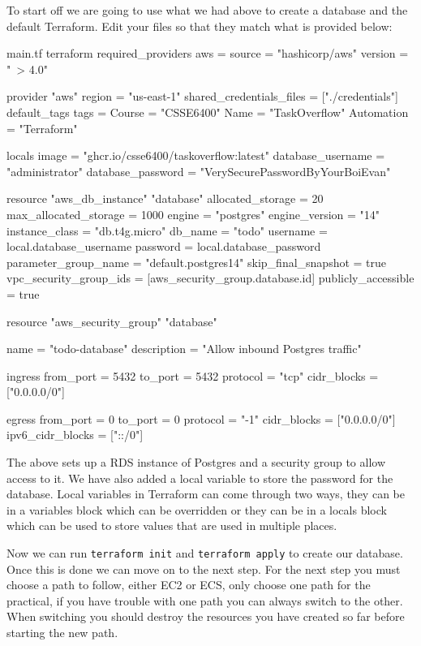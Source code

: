 \documentclass{csse4400}
\begin{document}
To start off we are going to use what we had above to create a database and the default Terraform. Edit your files so that they match what is provided below:

\begin{code}[language=terraform,numbers=none]{main.tf}
  terraform {
    required_providers {
        aws = {
            source  = "hashicorp/aws"
            version = "~> 4.0"
        }
    }
}

provider "aws" {
    region = "us-east-1"
    shared_credentials_files = ["./credentials"]
    default_tags {
        tags = {
            Course       = "CSSE6400"
            Name         = "TaskOverflow"
            Automation   = "Terraform"
        }
    }
}

locals {
    image             = "ghcr.io/csse6400/taskoverflow:latest"
    database_username = "administrator"
    database_password = "VerySecurePasswordByYourBoiEvan"
}

resource "aws_db_instance" "database" {
  allocated_storage      = 20
  max_allocated_storage  = 1000
  engine                 = "postgres"
  engine_version         = "14"
  instance_class         = "db.t4g.micro"
  db_name                = "todo"
  username               = local.database_username
  password               = local.database_password
  parameter_group_name   = "default.postgres14"
  skip_final_snapshot    = true
  vpc_security_group_ids = [aws_security_group.database.id]
  publicly_accessible    = true
}

resource "aws_security_group" "database" {
  name        = "todo-database"
  description = "Allow inbound Postgres traffic"

  ingress {
    from_port        = 5432
    to_port          = 5432
    protocol         = "tcp"
    cidr_blocks      = ["0.0.0.0/0"]
  }

  egress {
    from_port        = 0
    to_port          = 0
    protocol         = "-1"
    cidr_blocks      = ["0.0.0.0/0"]
    ipv6_cidr_blocks = ["::/0"]
  }
}
\end{code}

The above sets up a RDS instance of Postgres and a security group to allow access to it. We have also added a local variable to store the password for the database. Local variables in Terraform can come through two ways, they can be in a variables block which can be overridden or they can be in a locals block which can be used to store values that are used in multiple places.

Now we can run \texttt{terraform init} and \texttt{terraform apply} to create our database. Once this is done we can move on to the next step. For the next step you must choose a path to follow, either EC2 or ECS, only choose one path for the practical, if you have trouble with one path you can always switch to the other. When switching you should destroy the resources you have created so far before starting the new path.
\end{document}
